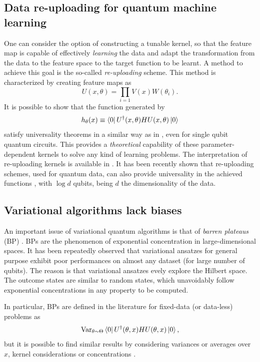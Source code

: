 \documentclass[]{report}
\begin{document}
\subsection{Data re-uploading for quantum machine learning}\label{sec.re-uploading}

One can consider the option of constructing a tunable kernel, so that the feature map is capable of effectively \textit{learning} the data and adapt the transformation from the data to the feature space to the target function to be learnt. A method to achieve this goal is the so-called \textit{re-uploading} scheme. This method is characterized by creating feature maps as
\begin{equation}
U(x, \theta) = \prod_{i = 1} V(x) W(\theta_i). 
\end{equation}
It is possible to show that the function generated by
\begin{equation}
h_\theta(x) \equiv \bra 0 U^\dagger(x, \theta) H U(x, \theta) \ket 0 
\end{equation}
satisfy universality theorems in a similar way as in , even for single qubit quantum circuits. This provides a \textit{theoretical} capability of these parameter-dependent kernels to solve any kind of learning problems. The interpretation of re-uploading kernels is available in . It has been recently shown that re-uploading schemes, used for quantum data, can also provide universality in the achieved functions \cite{perez-salinas2024universal}, with $\log d$ qubits, being $d$ the dimensionality of the data. 



\subsection{Variational algorithms lack biases}

An important issue of variational quantum algorithms is that of \textit{barren plateaus} (BP) \cite{mcclean2018barren, larocca2022diagnosing}. BPs are the phenomenon of exponential concentration in large-dimensional spaces. It has been repeatedly observed that variational ansatzes for general purpose exhibit poor performances on almost any dataset (for large number of qubits). The reason is that variational ansatzes evely explore the Hilbert space. The outcome states are similar to random states, which unavoidably follow exponential concentrations in any property to be computed. 

In particular, BPs are defined in the literature for fixed-data (or data-less) problems as
\begin{equation}
\operatorname{Var}_{\theta \sim \Theta} \bra 0 U^\dagger(\theta, x) H U(\theta, x) \ket 0, 
\end{equation}
but it is possible to find similar results by considering variances or averages over $x$, kernel considerations or concentrations \cite{thanasilp2024exponential, barthe2024gradients}. 
\end{document}
